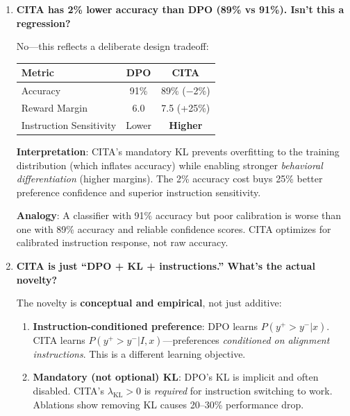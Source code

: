 \begin{enumerate}[label=\textbf{Q\arabic*.}, leftmargin=*, itemsep=8pt]
\vspace{4mm}

\item \textbf{CITA has 2\% lower accuracy than DPO (89\% vs 91\%). Isn't this a regression?}

 No---this reflects a deliberate design tradeoff:

\begin{table}[ht!]
\centering
\small
\renewcommand{\arraystretch}{1.2}
\begin{tabular}{@{}lcc@{}}
\toprule
\textbf{Metric} & \textbf{DPO} & \textbf{CITA} \\
\midrule
Accuracy & 91\% & 89\% ($-$2\%) \\ \hline
Reward Margin & 6.0 & 7.5 (+25\%) \\ \hline
Instruction Sensitivity & Lower & \textbf{Higher} \\
\bottomrule
\end{tabular}
\end{table}

\textbf{Interpretation}: CITA's mandatory KL prevents overfitting to the training distribution (which inflates accuracy) while enabling stronger \textit{behavioral differentiation} (higher margins). The 2\% accuracy cost buys 25\% better preference confidence and superior instruction sensitivity.

\textbf{Analogy}: A classifier with 91\% accuracy but poor calibration is worse than one with 89\% accuracy and reliable confidence scores. CITA optimizes for calibrated instruction response, not raw accuracy.

\vspace{4mm}

\item \textbf{CITA is just ``DPO + KL + instructions.'' What's the actual novelty?}

 The novelty is \textbf{conceptual and empirical}, not just additive:

\begin{enumerate}[leftmargin=*,itemsep=2pt]
    \item \textbf{Instruction-conditioned preference}: DPO learns $P(y^+ > y^- | x)$. CITA learns $P(y^+ > y^- | I, x)$---preferences \textit{conditioned on alignment instructions}. This is a different learning objective.

    \item \textbf{Mandatory (not optional) KL}: DPO's KL is implicit and often disabled. CITA's $\lambda_{\text{KL}} > 0$ is \textit{required} for instruction switching to work. Ablations show removing KL causes 20--30\% performance drop.


\end{enumerate}
\end{enumerate}
